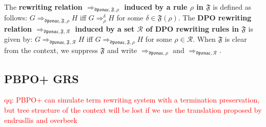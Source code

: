 \begin{definition}
  The \textbf{rewriting relation $\Rightarrow_{\mathfrak{dponac},\mathfrak{F},\rho}$ induced by a rule $\rho$ in $\mathfrak{F}$} is defined as follows: $G \Rightarrow_{\mathfrak{dponac},\mathfrak{F},\rho} H$ iff $G \Rightarrow_\rho^\delta H$ for some $\delta \in \mathfrak{F}(\rho)$. 
     The \textbf{DPO rewriting relation $\Rightarrow_{\mathfrak{dponac},\mathfrak{F},\mathcal{R}}$ induced by a set $\mathcal{R}$ of DPO rewriting rules in $\mathfrak{F}$} is given by: $G \Rightarrow_{\mathfrak{dponac}, \mathfrak{F},\mathcal{R}} H$ iff $G \Rightarrow_{\mathfrak{dponac},\mathfrak{F}, \rho} H$ for some $\rho \in \mathcal{R}$. When $\mathfrak{F}$ is clear from the context, we 
    suppress $\mathfrak{F}$ and 
    write $\Rightarrow_{\mathfrak{dponac},\rho}$ and $\Rightarrow_{\mathfrak{dponac},\mathcal{R}}$.
\end{definition}

\subsection{PBPO+ GRS}
\textcolor{red}{qq: PBPO+ can simulate term rewriting system with a termination preservation, but tree structure of the context will be lost if we use the translation proposed by endrusllis and overbeek}

